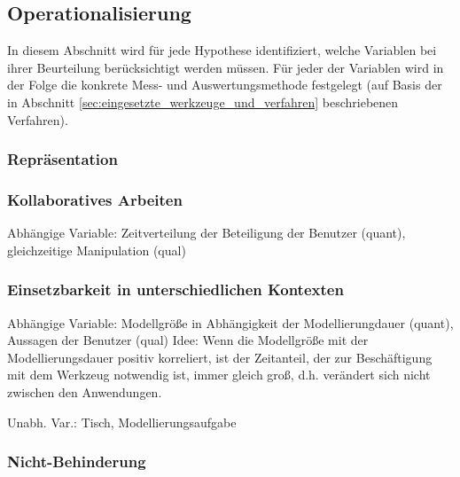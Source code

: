 \subsection{Operationalisierung} %
\label{sub:operationalisierung}

In diesem Abschnitt wird für jede Hypothese identifiziert, welche Variablen bei ihrer Beurteilung berücksichtigt werden müssen. Für jeder der Variablen wird in der Folge die konkrete Mess- und Auswertungsmethode festgelegt (auf Basis der in Abschnitt \ref{sec:eingesetzte_werkzeuge_und_verfahren} beschriebenen Verfahren).  

\subsubsection{Repräsentation} %
\label{ssub:repräsentation}


\subsubsection{Kollaboratives Arbeiten} %
\label{ssub:kollaboratives_arbeiten}

Abhängige Variable: Zeitverteilung der Beteiligung der Benutzer (quant), gleichzeitige Manipulation (qual)


\subsubsection{Einsetzbarkeit in unterschiedlichen Kontexten} %
\label{ssub:einsetzbarkeit_in_unterschiedlichen_kontexten}

Abhängige Variable: Modellgröße in Abhängigkeit der Modellierungdauer (quant), Aussagen der Benutzer (qual)
Idee: Wenn die Modellgröße mit der Modellierungsdauer positiv korreliert, ist der Zeitanteil, der zur Beschäftigung mit dem Werkzeug notwendig ist, immer gleich groß, d.h. verändert sich nicht zwischen den Anwendungen. 

Unabh. Var.: Tisch, Modellierungsaufgabe


\subsubsection{Nicht-Behinderung} %
\label{ssub:nicht_behinderung}

